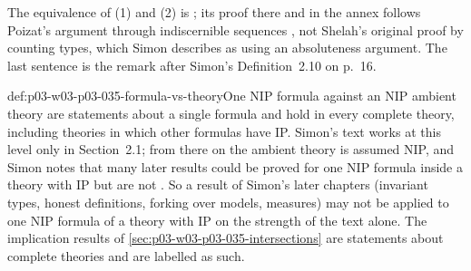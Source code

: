 The equivalence of (1) and (2) is
\cite[Proposition~2.11, p.~16]{Simon2015GuideManuscript}; its proof there and
in the annex follows Poizat's argument through indiscernible sequences
\cite[p.~36]{Simon2015GuideManuscript}, not Shelah's original proof by
counting types, which Simon describes as using an absoluteness argument.
The last sentence is the remark after Simon's Definition~2.10 on p.~16.

\begin{hbwarning}{def:p03-w03-p03-035-formula-vs-theory}{One NIP formula against an NIP ambient theory}
are statements about a single formula and hold in every complete theory,
including theories in which other formulas have IP.  Simon's text works at
this level only in Section~2.1; from there on the ambient theory is assumed
NIP, and Simon notes that many later results could be proved for one NIP
formula inside a theory with IP but are not
\cite[p.~9]{Simon2015GuideManuscript}.  So a result of Simon's later chapters
(invariant types, honest definitions, forking over models, measures) may
not be applied to one NIP formula of a theory with IP on the strength of the
text alone.  The implication results of
\cref{sec:p03-w03-p03-035-intersections} are statements about complete
theories and are labelled as such.
\end{hbwarning}

